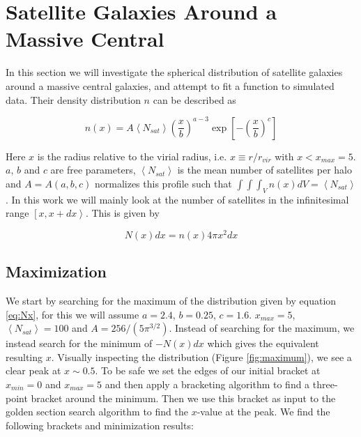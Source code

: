 \section{Satellite Galaxies Around a Massive Central}

In this section we will investigate the spherical distribution of satellite galaxies around a massive central galaxies, and attempt to  fit a function to simulated data. Their density distribution $n$ can be described as

\begin{equation}
    n(x) = A\left<N_{sat}\right>\left(\frac{x}{b}\right)^{a-3}\exp{\left[-\left(\frac{x}{b}\right)^{c}\right]}\label{eq:nx}
\end{equation}

Here $x$ is the radius relative to the virial radius, i.e. $x \equiv r/r_{vir}$ with $x < x_{max} = 5$. $a$, $b$ and $c$ are free parameters, $\left<N_{sat}\right>$ is the mean number of satellites per halo and $A = A(a,b,c)$ normalizes this profile such that $\int\int\int_V n(x)dV = \left<N_{sat}\right>$. In this work we will mainly look at the number of satellites in the infinitesimal range $\left[x, x+dx\right>$. This is given by

\begin{equation}
    N(x)dx = n(x)4\pi x^2dx\label{eq:Nx}
\end{equation}



\subsection{Maximization}\label{sec:maxi}

We start by searching for the maximum of the distribution given by equation \ref{eq:Nx}, for this we will assume $a=2.4$, $b=0.25$, $c=1.6$. $x_{max}=5$, $\left<N_{sat}\right>=100$ and $A=256/(5\pi^{3/2})$. Instead of searching for the maximum, we instead search for the minimum of $-N(x)dx$ which gives the equivalent resulting $x$. Visually inspecting the distribution (Figure \ref{fig:maximum}), we see a clear peak at $x \sim 0.5$. To be safe we set the edges of our initial bracket at $x_{min} = 0$ and $x_{max} = 5$ and then apply a bracketing algorithm to find a three-point bracket around the minimum. Then we use this bracket as input to the golden section search algorithm to find the $x$-value at the peak. We find the following brackets and minimization results:  

